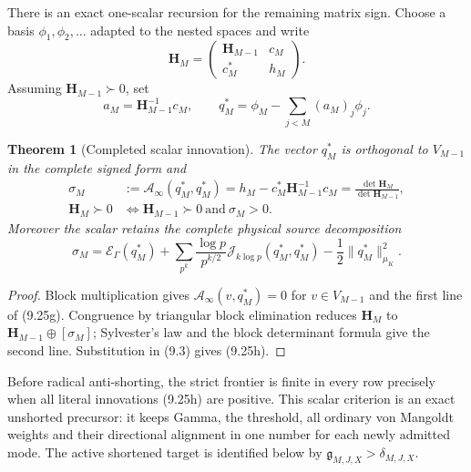 \documentclass[11pt]{amsart}
\newtheorem{theorem}{Theorem}[section]
\theoremstyle{definition}
\theoremstyle{remark}
\begin{document}
There is an exact one-scalar recursion for the remaining matrix sign.
Choose a basis \(\phi_1,\phi_2,\ldots\) adapted to the nested spaces and
write
\[
 \mathbf H_M=
 \begin{pmatrix}\mathbf H_{M-1}&c_M\\c_M^*&h_M\end{pmatrix}.
\tag{9.25e}
\]
Assuming \(\mathbf H_{M-1}\succ0\), set
\[
 a_M=\mathbf H_{M-1}^{-1}c_M,
 \qquad
 q_M^*=\phi_M-\sum_{j<M}(a_M)_j\phi_j.
\tag{9.25f}
\]

\begin{theorem}[Completed scalar innovation]
\label{thm:scalar-innovation}
The vector \(q_M^*\) is orthogonal to \(V_{M-1}\) in the complete signed
form and
\[
\boxed{
 \begin{aligned}
 \sigma_M
 &:={\mathcal A}_\infty(q_M^*,q_M^*)
 =h_M-c_M^*\mathbf H_{M-1}^{-1}c_M
 =\frac{\det\mathbf H_M}{\det\mathbf H_{M-1}},\\
 \mathbf H_M\succ0
 &\Longleftrightarrow
 \mathbf H_{M-1}\succ0\ \text{and}\ \sigma_M>0.
 \end{aligned}}
\tag{9.25g}
\]
Moreover the scalar retains the complete physical source decomposition
\[
 \boxed{
 \sigma_M=\mathscr E_\Gamma(q_M^*)
 +\sum_{p^k}\frac{\log p}{p^{k/2}}
       \mathcal J_{k\log p}(q_M^*,q_M^*)
 -\frac12\lVert q_M^*\rVert_{\mu_K}^2.}
\tag{9.25h}
\]
\end{theorem}

\begin{proof}
Block multiplication gives
\({\mathcal A}_\infty(v,q_M^*)=0\) for \(v\in V_{M-1}\) and the first
line of (9.25g).  Congruence by triangular block elimination reduces
\(\mathbf H_M\) to \(\mathbf H_{M-1}\oplus[\sigma_M]\); Sylvester's law
and the block determinant formula give the second line.  Substitution in
(9.3) gives (9.25h).
\end{proof}

Before radical anti-shorting, the strict frontier is finite in every row
precisely when all literal innovations (9.25h) are positive.  This scalar
criterion is an exact unshorted precursor: it keeps Gamma, the threshold,
all ordinary von Mangoldt weights and their directional alignment in one
number for each newly admitted mode.  The active shortened target is
identified below by \(\mathfrak g_{M,J,X}>\delta_{M,J,X}\).
\end{document}
